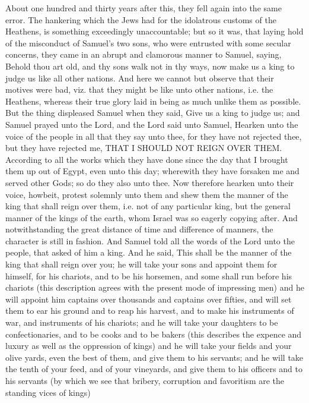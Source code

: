 \documentclass[12pt,oneside]{memoir}
\begin{document}
About one hundred and thirty years after this, they fell again into
the same error. The hankering which the Jews had for the idolatrous
customs of the Heathens, is something exceedingly unaccountable; but
so it was, that laying hold of the misconduct of Samuel's two sons,
who were entrusted with some secular concerns, they came in an
abrupt and clamorous manner to Samuel, saying, Behold thou art old,
and thy sons walk not in thy ways, now make us a king to judge us
like all other nations. And here we cannot but observe that their
motives were bad, viz. that they might be like unto other nations,
i.e. the Heathens, whereas their true glory laid in being as much
unlike them as possible. But the thing displeased Samuel when they
said, Give us a king to judge us; and Samuel prayed unto the Lord,
and the Lord said unto Samuel, Hearken unto the voice of the people
in all that they say unto thee, for they have not rejected thee, but
they have rejected me, THAT I SHOULD NOT REIGN OVER THEM. According
to all the works which they have done since the day that I brought
them up out of Egypt, even unto this day; wherewith they have
forsaken me and served other Gods; so do they also unto thee. Now
therefore hearken unto their voice, howbeit, protest solemnly unto
them and shew them the manner of the king that shall reign over them,
i.e. not of any particular king, but the general manner of the kings
of the earth, whom Israel was so eagerly copying after. And
notwithstanding the great distance of time and difference of manners,
the character is still in fashion. And Samuel told all the words of
the Lord unto the people, that asked of him a king. And he said,
This shall be the manner of the king that shall reign over you; he
will take your sons and appoint them for himself, for his chariots,
and to be his horsemen, and some shall run before his chariots (this
description agrees with the present mode of impressing men) and he
will appoint him captains over thousands and captains over fifties,
and will set them to ear his ground and to reap his harvest, and to
make his instruments of war, and instruments of his chariots; and he
will take your daughters to be confectionaries, and to be cooks and
to be bakers (this describes the expence and luxury as well as the
oppression of kings) and he will take your fields and your olive
yards, even the best of them, and give them to his servants; and he
will take the tenth of your feed, and of your vineyards, and give
them to his officers and to his servants (by which we see that
bribery, corruption and favoritism are the standing vices of kings)
\end{document}
